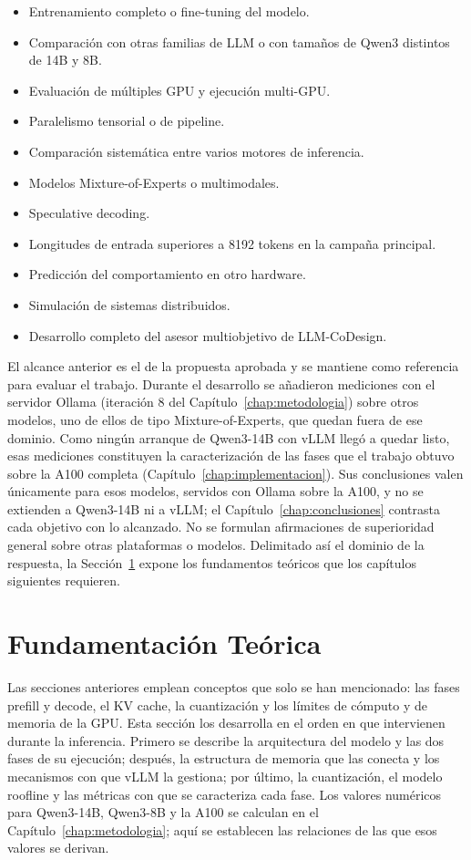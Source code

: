 \begin{itemize}
  \item Entrenamiento completo o fine-tuning del modelo.
  \item Comparación con otras familias de LLM o con tamaños de Qwen3 distintos de 14B y 8B.
  \item Evaluación de múltiples GPU y ejecución multi-GPU.
  \item Paralelismo tensorial o de pipeline.
  \item Comparación sistemática entre varios motores de inferencia.
  \item Modelos Mixture-of-Experts o multimodales.
  \item Speculative decoding.
  \item Longitudes de entrada superiores a 8192 tokens en la campaña principal.
  \item Predicción del comportamiento en otro hardware.
  \item Simulación de sistemas distribuidos.
  \item Desarrollo completo del asesor multiobjetivo de LLM-CoDesign.
\end{itemize}

El alcance anterior es el de la propuesta aprobada y se mantiene como referencia para evaluar el trabajo. Durante el desarrollo se añadieron mediciones con el servidor Ollama (iteración 8 del Capítulo~\ref{chap:metodologia}) sobre otros modelos, uno de ellos de tipo Mixture-of-Experts, que quedan fuera de ese dominio. Como ningún arranque de Qwen3-14B con vLLM llegó a quedar listo, esas mediciones constituyen la caracterización de las fases que el trabajo obtuvo sobre la A100 completa (Capítulo~\ref{chap:implementacion}). Sus conclusiones valen únicamente para esos modelos, servidos con Ollama sobre la A100, y no se extienden a Qwen3-14B ni a vLLM; el Capítulo~\ref{chap:conclusiones} contrasta cada objetivo con lo alcanzado. No se formulan afirmaciones de superioridad general sobre otras plataformas o modelos. Delimitado así el dominio de la respuesta, la Sección~\ref{sec:cap1:fundamentacion} expone los fundamentos teóricos que los capítulos siguientes requieren.

\section{Fundamentación Teórica}
\label{sec:cap1:fundamentacion}

Las secciones anteriores emplean conceptos que solo se han mencionado: las fases prefill y decode, el KV cache, la cuantización y los límites de cómputo y de memoria de la GPU. Esta sección los desarrolla en el orden en que intervienen durante la inferencia. Primero se describe la arquitectura del modelo y las dos fases de su ejecución; después, la estructura de memoria que las conecta y los mecanismos con que vLLM la gestiona; por último, la cuantización, el modelo roofline y las métricas con que se caracteriza cada fase. Los valores numéricos para Qwen3-14B, Qwen3-8B y la A100 se calculan en el Capítulo~\ref{chap:metodologia}; aquí se establecen las relaciones de las que esos valores se derivan.

